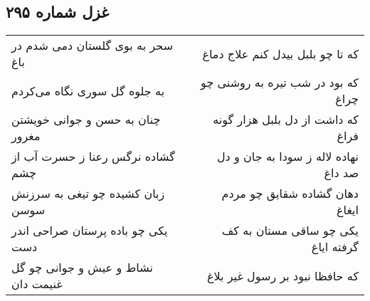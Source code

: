 \begin{center}
\section*{غزل شماره ۲۹۵}
\label{sec:sh295}
\begin{longtable}{l p{0.5cm} r}
سحر به بوی گلستان دمی شدم در باغ
&&
که تا چو بلبل بیدل کنم علاج دماغ
\\
به جلوه گل سوری نگاه می‌کردم
&&
که بود در شب تیره به روشنی چو چراغ
\\
چنان به حسن و جوانی خویشتن مغرور
&&
که داشت از دل بلبل هزار گونه فراغ
\\
گشاده نرگس رعنا ز حسرت آب از چشم
&&
نهاده لاله ز سودا به جان و دل صد داغ
\\
زبان کشیده چو تیغی به سرزنش سوسن
&&
دهان گشاده شقایق چو مردم ایغاغ
\\
یکی چو باده پرستان صراحی اندر دست
&&
یکی چو ساقی مستان به کف گرفته ایاغ
\\
نشاط و عیش و جوانی چو گل غنیمت دان
&&
که حافظا نبود بر رسول غیر بلاغ
\\
\end{longtable}
\end{center}
